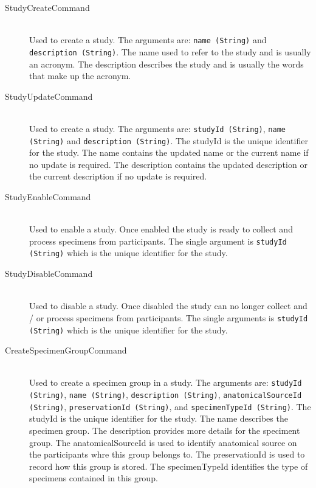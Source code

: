 \begin{description}

    \item[StudyCreateCommand] \hfill \\ Used to create a study. The arguments
      are: \texttt{name (String)} and \texttt{description (String)}. The name
      used to refer to the study and is usually an acronym. The description
      describes the study and is usually the words that make up the acronym.

    \item[StudyUpdateCommand] \hfill \\ Used to create a study. The arguments
      are: \texttt{studyId (String)}, \texttt{name (String)} and
      \texttt{description (String)}. The studyId is the unique identifier for
      the study. The name contains the updated name or the current name if no
      update is required. The description contains the updated description or
      the current description if no update is required.

    \item[StudyEnableCommand] \hfill \\ Used to enable a study. Once enabled
      the study is ready to collect and process specimens from
      participants. The single argument is \texttt{studyId (String)} which is
      the unique identifier for the study.

    \item[StudyDisableCommand] \hfill \\ Used to disable a study. Once disabled
      the study can no longer collect and / or process specimens from
      participants. The single arguments is \texttt{studyId (String)} which is
      the unique identifier for the study.

    \item[CreateSpecimenGroupCommand] \hfill \\ Used to create
      a specimen group in a study. The arguments are: \texttt{studyId
	(String)}, \texttt{name (String)}, \texttt{description (String)},
      \texttt{anatomicalSourceId (String)}, \texttt{preservationId (String)},
      and \texttt{specimenTypeId (String)}. The studyId is the unique
      identifier for the study. The name describes the specimen group. The
      description provides more details for the speciment group.  The
      anatomicalSourceId is used to identify anatomical source on the
      participants whre this group belongs to.  The preservationId is used to
      record how this group is stored.  The specimenTypeId identifies the type
      of specimens contained in this group.


\end{description}
